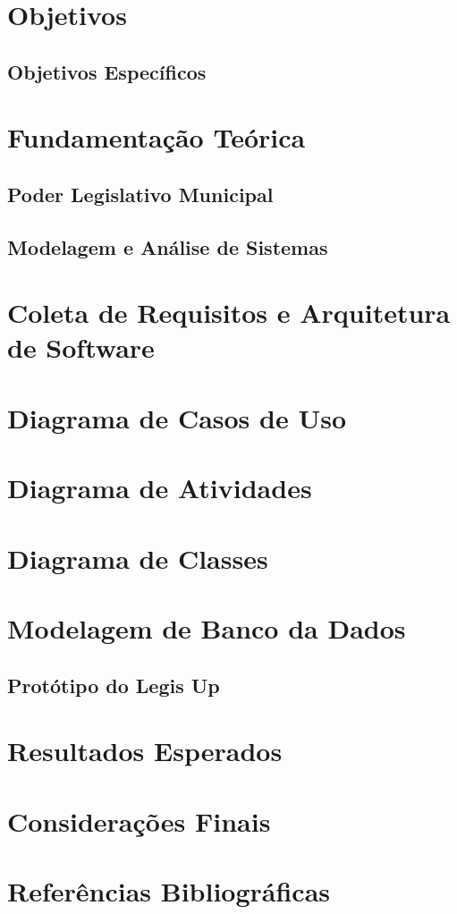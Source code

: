 \documentclass[12pt]{article}
\begin{document}
\section{Objetivos}
\subsection{Objetivos Específicos}
\section{Fundamentação Teórica}
\subsection{Poder Legislativo Municipal}
\subsection{Modelagem e Análise de Sistemas}
\section{Coleta de Requisitos e Arquitetura de Software}
\section{Diagrama de Casos de Uso}
\section{Diagrama de Atividades}
\section{Diagrama de Classes}
\section{Modelagem de Banco da Dados}
\subsection{Protótipo do Legis Up}
\section{Resultados Esperados}
\section{Considerações Finais}
\section{Referências Bibliográficas}
\end{document}
